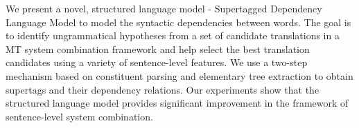 We present a novel, structured language model - Supertagged Dependency Language Model to model the syntactic dependencies between words. The goal is to
 identify ungrammatical hypotheses from a set of candidate translations in a MT
 system combination framework and help select the best translation candidates
 using a variety of sentence-level features. We use a two-step mechanism based
 on constituent parsing and elementary tree extraction to obtain supertags and
 their dependency relations. Our experiments show that the structured language
 model provides significant improvement in the framework of sentence-level
 system combination.

